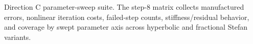 \caption{Direction C parameter-sweep suite. The step-8 matrix collects manufactured errors, nonlinear iteration costs, failed-step counts, stiffness/residual behavior, and coverage by swept parameter axis across hyperbolic and fractional Stefan variants.}
\label{fig:direction-c-parameter-suite}
